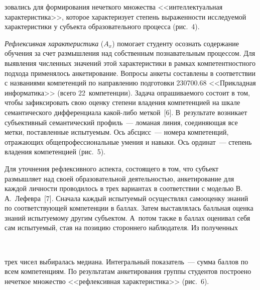 \begin{multicols}{2}

      


\noindent
зовались для формирования нечеткого множества 
<<интеллектуальная характеристика>>, которое характеризует степень 
выраженности исследуемой характеристики у субъекта образовательного 
процесса (рис.~4).





     \textit{Рефлексивная характеристика} ($A_x$) помогает студенту 
осознать содержание обучения за счет размышления над собственным 
познавательным процессом. Для выявления численных значений этой 
характеристики в рамках компетентностного подхода применялось 
анкетирование. Вопросы анкеты составлены в соответствии с названиями 
компетенций по направлению подготовки 230700.68 <<Прикладная 
информатика>> (всего 22~компетенции). Задача опрашиваемого состоит в 
том, чтобы зафиксировать свою оценку степени владения компетенцией на 
шкале семантического дифференциала какой-либо меткой~[6]. В~результате 
возникает субъективный семантический профиль~--- ломаная линия, 
соединяющая все метки, поставленные испытуемым. Ось абсцисс~--- номера 
компетенций, отражающих общепрофессиональные умения и навыки. Ось 
ординат~--- степень владения компетенцией (рис.~5).



     Для уточнения рефлексивного аспекта, состоящего в том, что субъект 
размышляет над своей образовательной деятельностью, анкетирование для 
каждой личности проводилось в трех вариантах в соответствии с моделью 
В.\,А.~Лефевра~[7]. Сначала каждый испытуемый осуществлял самооценку 
знаний по соответствующей компетенции в баллах. Затем выставлялась 
балльная оценка знаний испытуемому другим субъектом. А~потом также в 
баллах оценивал себя сам испытуемый, став на позицию стороннего 
наблюдателя. Из полученных
\begin{figure*}
\vspace*{1pt}
\begin{center}  %
 \mbox{%
 \epsfxsize=157.636mm
 }
  \end{center}
  \vspace*{-12pt}
  \begin{minipage}[t]{80mm}
\end{minipage}
\hfill
\begin{minipage}[t]{80mm}
\end{minipage}
\end{figure*}
 трех чисел выбиралась медиана. Интегральный 
показатель~--- сумма баллов по всем компетенциям. По результатам 
анкетирования группы студентов построено нечеткое множество 
<<рефлексивная характеристика>> (рис.~6). 



\end{multicols}
